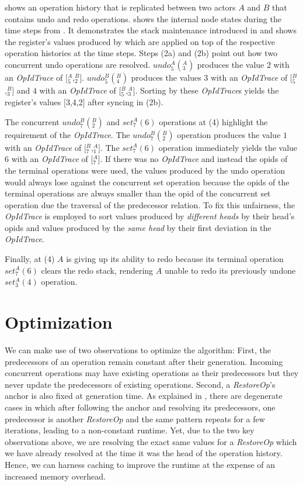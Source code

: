 \documentclass[sigplan,natbib=false,review]{acmart}
\newcommand{\opid}[2]{$\mathit{_{#1}^{#2}}$}
\newcommand{\setop}[4][set]{$\mathit{#1_{#2}^{#3}}{(#4)}$}
\newcommand{\undop}[5][undo]{$\mathit{#1_{#2}^{#3}}{(_{#4}^{#5})}$}
\newcommand{\stack}[1]{$[$#1$]$}
\newcommand{\restopkind}{\textit{RestoreOp}}
\newcommand{\opidtrace}{\textit{OpIdTrace}}
\begin{document}
 shows an operation history that is replicated
between two actors $A$ and $B$ that contains undo and redo operations.
 shows the internal node states during the time steps
from .
It demonstrates the stack maintenance introduced in  and
shows the register's values produced by
 which are applied on top
of the respective operation histories at the time steps.
Steps (2a) and (2b) point out how two concurrent undo operations are resolved.
\undop{5}{A}{3}{A} produces the value $2$ with an \opidtrace{} of
\stack{\opid{5}{A},\opid{2}{B}}.
\undop{5}{B}{4}{B} produces the values $3$ with an \opidtrace{} of
\stack{\opid{5}{B},\opid{3}{B}}
and $4$ with an \opidtrace{} of
\stack{\opid{5}{B},\opid{3}{A}}.
Sorting by these \opidtrace{}s yields the register's values \stack{3,4,2}
after syncing in (2b).

The concurrent \undop{7}{B}{2}{B} and \setop{7}{A}{6} operations at (4) highlight
the requirement of the \opidtrace{}.
The \undop{7}{B}{2}{B} operation produces the value $1$ with an \opidtrace{} of
\stack{\opid{7}{B},\opid{1}{A}}.
The \setop{7}{A}{6} operation immediately yields the value $6$ with an
\opidtrace{} of \stack{\opid{7}{A}}.
If there was no \opidtrace{} and instead the \glspl*{opid} of the terminal
operations were used, the values produced by the undo operation would
always lose against the concurrent set operation because the \glspl*{opid} of the
terminal operations are always smaller than the \gls*{opid} of the concurrent
set operation due the traversal of the predecessor relation.
To fix this unfairness, the \opidtrace{} is employed to sort values produced by
\emph{different heads} by their head's \glspl*{opid} and
values produced by the \emph{same head}
by their first deviation in the \opidtrace{}.

Finally, at (4) $A$ is giving up its ability to redo because its terminal
operation \setop{7}{A}{6} clears the redo stack, rendering $A$ unable to redo its
previously undone \setop{3}{A}{4} operation.

\section{Optimization}\label{sec:opt}

We can make use of two observations to optimize the algorithm:
First, the predecessors of an operation remain constant after their generation.
Incoming concurrent operations may have existing operations as their predecessors
but they never update the predecessors of existing operations.
Second, a \restopkind{}'s anchor is also fixed at generation time.
As explained in , there are degenerate cases in which after
following the anchor and resolving its predecessors, one predecessor is another
\restopkind{} and the same pattern repeats for a few iterations,
leading to a non-constant runtime.
Yet, due to the two key observations above, we are resolving the exact same values
for a \restopkind{} which we have already resolved at the time it was the head of
the operation history.
Hence, we can harness caching to improve the runtime at the expense of an
increased memory overhead.
\end{document}
